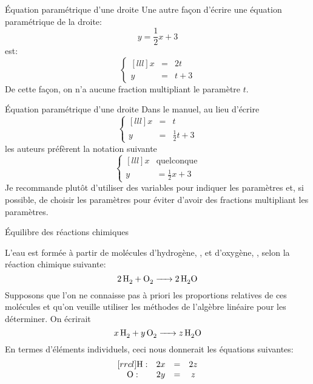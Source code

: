 \documentclass[french]{beamer}
\begin{document}
\begin{frame}{Équation paramétrique d'une droite}
Une autre façon d'écrire une équation paramétrique
de la droite:
\[
y = \frac12 x + 3
\]
est:
\[
\left\{
\begin{matrix}[lll]
x &=& 2t \\
y &=& t + 3
\end{matrix}
\right.
\]
De cette façon, on n'a aucune fraction multipliant le paramètre $t$.
\end{frame}

\begin{frame}{Équation paramétrique d'une droite}
Dans le manuel, au lieu d'écrire
\[
\left\{
\begin{matrix}[lll]
x &=& t \\
y &=& \frac12 t + 3
\end{matrix}
\right.
\]
les auteurs préfèrent la notation suivante
\[
\left\{
\begin{matrix}[lll]
x &\mbox{quelconque} \\
y &= \frac12 x + 3
\end{matrix}
\right.
\]
Je recommande plutôt d'utiliser des variables pour
indiquer les paramètres et, si possible, de choisir
les paramètres pour éviter d'avoir des fractions
multipliant les paramètres.
\end{frame}


\begin{frame}{Équilibre des réactions chimiques}

L'eau est formée à partir de molécules d'hydrogène,
, et d'oxygène, , selon la réaction
chimique suivante:
\[
\ce{$2\,$H2 + O2 -> $2\,$H2O }
\]
Supposons que l'on ne connaisse pas à priori les proportions relatives de ces molécules et qu'on veuille utiliser les méthodes de l'algèbre linéaire pour les déterminer.
On écrirait
\[
\ce{$x\,$H2 + $y\,$O2 -> $z\,$H2O }
\]
En termes d'éléments individuels, ceci nous
donnerait les équations suivantes:
\[
\begin{matrix}[rrcl]
\cf{H}: & 2x &=& 2z \\
\cf{O}: & 2y &=& z
\end{matrix}
\]
\end{frame}
\end{document}
